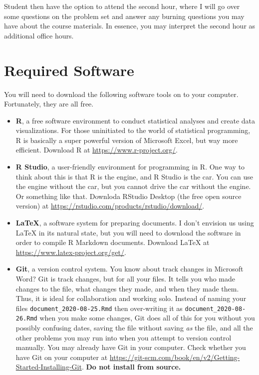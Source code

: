 \documentclass[11pt,]{article}
\begin{document}
Student then have the option to attend the second hour, where I will go
over some questions on the problem set and answer any burning questions
you may have about the course materials. In essence, you may interpret
the second hour as additional office hours.

\hypertarget{required-software}{%
\section{Required Software}\label{required-software}}

You will need to download the following software tools on to your
computer. Fortunately, they are all free.

\begin{itemize}
\item
  \textbf{R}, a free software environment to conduct statistical
  analyses and create data visualizations. For those uninitiated to the
  world of statistical programming, R is basically a super powerful
  version of Microsoft Excel, but way more efficient. Download R at
  \url{https://www.r-project.org/}.
\item
  \textbf{R Studio}, a user-friendly environment for programming in R.
  One way to think about this is that R is the engine, and R Studio is
  the car. You can use the engine without the car, but you cannot drive
  the car without the engine. Or something like that. Downloda RStudio
  Desktop (the free open source version) at
  \url{https://rstudio.com/products/rstudio/download/}.
\item
  \textbf{LaTeX}, a software system for preparing documents. I don't
  envision us using LaTeX in its natural state, but you will need to
  download the software in order to compile R Markdown documents.
  Download LaTeX at \url{https://www.latex-project.org/get/}.
\item
  \textbf{Git}, a version control system. You know about track changes
  in Microsoft Word? Git is track changes, but for all your files. It
  tells you who made changes to the file, what changes they made, and
  when they made them. Thus, it is ideal for collaboration and working
  solo. Instead of naming your files \texttt{document\_2020-08-25.Rmd}
  then over-writing it as \texttt{document\_2020-08-26.Rmd} when you
  make some changes, Git does all of this for you without you possibly
  confusing dates, saving the file without saving \emph{as} the file,
  and all the other problems you may run into when you attempt to
  version control manually. You may already have Git in your computer.
  Check whether you have Git on your computer at
  \url{https://git-scm.com/book/en/v2/Getting-Started-Installing-Git}.
  \textbf{Do not install from source.}
\end{itemize}
\end{document}
